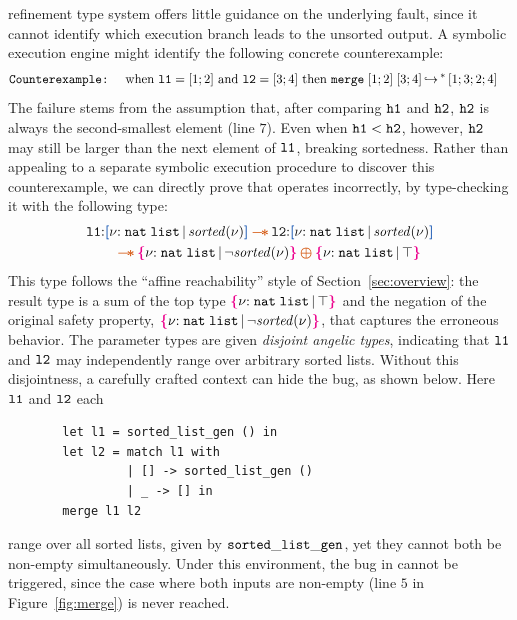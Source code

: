 refinement type system offers little guidance on the underlying fault,
since it cannot identify which execution branch leads to the unsorted
output.  A symbolic execution engine might identify the following
concrete counterexample:
\vspace{-0.2em}
\begin{align*}
    \texttt{Counterexample:}&\quad  \text{ when } \Code{l1} = [1;2] \text{ and } \Code{l2} = [3;4] \text{ then } \mstep{\Code{merge}\;[1;2]\;[3;4]}{[1;3;2;4]}
\end{align*}\noindent
The failure stems from the assumption that, after comparing
$\Code{h1}$ and $\Code{h2}$, $\Code{h2}$ is always the second-smallest
element (line $7$).  Even when $\Code{h1} < \Code{h2}$, however,
$\Code{h2}$ may still be larger than the next element of $\Code{l1}$,
breaking sortedness.  Rather than appealing to a separate symbolic
execution procedure to discover this counterexample, we can directly
prove that  operates incorrectly, by type-checking it with
the following type:
\vspace{-0.2em}
\begin{align*}
  &\Code{l1}{:}\urt{\List[\Code{nat}]}{\I{sorted}(\vnu)}
  \ctwand \Code{l2}{:}\urt{\List[\Code{nat}]}{\I{sorted}(\vnu)} \\
  &\qquad \ctwand \ort{\List[\Code{nat}]}{\neg \I{sorted}(\vnu)}
  \ctoplus \ort{\List[\Code{nat}]}{\top}
\end{align*}\noindent
This type follows the ``affine reachability'' style of
Section~\ref{sec:overview}: the result type is a sum of the top type
$\ort{\List[\Code{nat}]}{\top}$ and the negation of the original
safety property, $\ort{\List[\Code{nat}]}{\neg \I{sorted}(\vnu)}$,
that captures the erroneous behavior.  The parameter types are given
\emph{disjoint angelic types}, indicating that $\Code{l1}$ and
$\Code{l2}$ may independently range over arbitrary sorted lists.
Without this disjointness, a carefully crafted context can hide the
bug, as shown below. Here $\Code{l1}$ and $\Code{l2}$ each
\begin{figure}
  \begin{center}
    \vspace*{-.17in}
\begin{verbatim}
  let l1 = sorted_list_gen () in
  let l2 = match l1 with
           | [] -> sorted_list_gen ()
           | _ -> [] in
  merge l1 l2
\end{verbatim}
\end{center}
\vspace*{-.1in}
\end{figure}
range over all sorted lists, given by $\Code{sorted\_list\_gen}$, yet
they cannot both be non-empty simultaneously.  Under this environment,
the bug in  cannot be triggered, since the case where both inputs
are non-empty (line $5$ in Figure~\ref{fig:merge}) is never reached.

